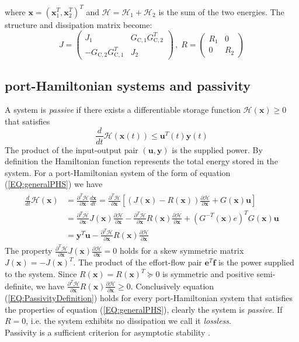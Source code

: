 \documentclass[a4paper,twoside, openright,12pt]{report}
\newcommand{\f}[1]{\boldsymbol{#1}}
\newcommand{\g}[1]{\text{#1}}
\begin{document}
where $ \f{x} = (\f{x}_1^T, \f{x}_2^T)^T $ and $\mathcal{H}  = \mathcal{H}_1 + \mathcal{H}_2 $ is the sum of the two energies. The structure and dissipation matrix become:
\[J = \begin{pmatrix} J_1 & G_{\g{C},1} G_{\g{C},2}^T \\ 
-G_{\g{C},2} G_{\g{C},1}^T & J_2\end{pmatrix} \, , \; 
R = \begin{pmatrix}
R_1 & 0 \\ 0 & R_2\end{pmatrix}\]

\subsection{port-Hamiltonian systems and passivity}
A system is \emph{passive} if there exists a differentiable storage function $\mathcal{H}(\f{x}) \geq 0$ that satisfies 
\begin{equation}\label{EQ:PassivityDefinition}
\frac{d}{dt}\mathcal{H}(\f{x}(t)) \leq \f{u}^T(t) \f{y}(t)
\end{equation}
The product of the input-output pair $(\f{u},\f{y})$ is the supplied power. By definition the Hamiltonian function represents the total energy stored in the system. For a port-Hamiltonian system of the form of equation (\ref{EQ:generalPHS}) we have
\begin{eqnarray}
\begin{aligned}
\frac{d}{dt}\mathcal{H}(\f{x}) &= \frac{\partial^T \mathcal{H}}{\partial \f{x}} \frac{d\f{x}}{dt} = \frac{\partial^T \mathcal{H}}{\partial \f{x}}\left[(J(\f{x})-R(\f{x}))\frac{\partial \mathcal{H}}{\partial \f{x}} + G(\f{x})\f{u}\right]  \\
&= \frac{\partial^T \mathcal{H}}{\partial \f{x}}J(\f{x})\frac{\partial \mathcal{H}}{\partial \f{x}} - \frac{\partial^T \mathcal{H}}{\partial \f{x}}R(\f{x})\frac{\partial \mathcal{H}}{\partial \f{x}} + (G^{-T}(\f{x})e)^T G(\f{x})\f{u}  \\
&= \f{y}^T\f{u} - \frac{\partial^T \mathcal{H}}{\partial \f{x}}R(\f{x})\frac{\partial \mathcal{H}}{\partial \f{x}}
\end{aligned}
\end{eqnarray}
The property $\frac{\partial^T \mathcal{H}}{\partial \f{x}}J(\f{x})\frac{\partial \mathcal{H}}{\partial \f{x}}=0$ holds for a skew symmetric matrix $J(\f{x}) = -J(\f{x})^T$. The product of the effort-flow pair $\f{e}^T\f{f}$ is the power supplied to the system. Since $R(\f{x})=R(\f{x})^T \succeq 0$ is symmetric and positive semi-definite, we have $\frac{\partial^T \mathcal{H}}{\partial \f{x}}R(\f{x})\frac{\partial \mathcal{H}}{\partial \f{x}} \geq 0$. Conclusively equation (\ref{EQ:PassivityDefinition}) holds for every port-Hamiltonian system that satisfies the properties of equation (\ref{EQ:generalPHS}), clearly the system is \emph{passive}. If $R=0$, i.e. the system exhibits no dissipation we call it \emph{lossless}.\\
Passivity is a sufficient criterion for asymptotic stability \cite{Ortega_01}.  
\end{document}
